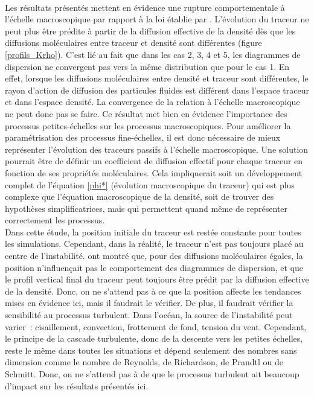 \documentclass[a4paper,12pt]{article}
\begin{document}
    \\
    \newline
    Les résultats présentés mettent en évidence une rupture comportementale à l'échelle macroscopique par rapport à la loi établie par \cite{penney_diapycnal_2020}. L'évolution du traceur ne peut plus être prédite à partir de la diffusion effective de la densité dès que les diffusions moléculaires entre traceur et densité sont différentes (figure \ref{profils_Krho}). C'est lié au fait que dans les cas 2, 3, 4 et 5, les diagrammes de dispersion ne convergent pas vers la même distribution que pour le cas 1. En effet, lorsque les diffusions moléculaires entre densité et traceur sont différentes, le rayon d'action de diffusion des particules fluides est différent dans l'espace traceur et dans l'espace densité. La convergence de la relation à l'échelle macroscopique ne peut donc pas se faire. Ce résultat met bien en évidence l'importance des processus petites-échelles sur les processus macroscopiques. Pour améliorer la paramétrisation des processus fine-échelles, il est donc nécessaire de mieux représenter l'évolution des traceurs passifs à l'échelle macroscopique. Une solution pourrait être de définir un coefficient de diffusion effectif pour chaque traceur en fonction de ses propriétés moléculaires. Cela impliquerait soit un développement complet de l'équation \ref{phi*} (évolution macroscopique du traceur) qui est plus complexe que l'équation macroscopique de la densité, soit de trouver des hypothèses simplificatrices, mais qui permettent quand même de représenter correctement les processus.
    \\
    \newline
    Dans cette étude, la position initiale du traceur est restée constante pour toutes les simulations. Cependant, dans la réalité, le traceur n'est pas toujours placé au centre de l'instabilité. \cite{penney_diapycnal_2020} ont montré que, pour des diffusions moléculaires égales, la position n'influençait pas le comportement des diagrammes de dispersion, et que le profil vertical final du traceur peut toujours être prédit par la diffusion effective de la densité. Donc, on ne s'attend pas à ce que la position affecte les tendances mises en évidence ici, mais il faudrait le vérifier. De plus, il faudrait vérifier la sensibilité au processus turbulent. Dans l'océan, la source de l'instabilité peut varier : cisaillement, convection, frottement de fond, tension du vent. Cependant, le principe de la cascade turbulente, donc de la descente vers les petites échelles, reste le même dans toutes les situations et dépend seulement des nombres sans dimension comme le nombre de Reynolds, de Richardson, de Prandtl ou de Schmitt. Donc, on ne s'attend pas à de que le processus turbulent ait beaucoup d'impact sur les résultats présentés ici.
\end{document}
